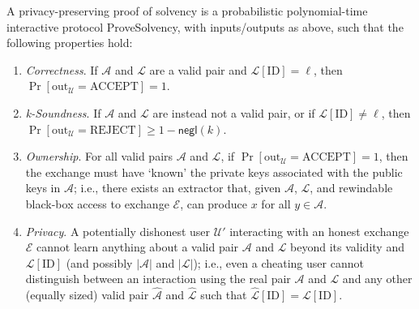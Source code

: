 \begin{definition}
\label{def:2}

A privacy-preserving proof of solvency is a probabilistic polynomial-time interactive protocol ProveSolvency, with inputs/outputs as above, such that the following properties hold:

\begin{enumerate}
\item \textit{Correctness}. If $\mathcal{A}$ and $\mathcal{L}$ are a valid pair and $\mathcal{L}[\text{ID}] = \ell$, then $\Pr[\text{out}_{\mathcal{U}} = \text{ACCEPT}] = 1$.
\item \textit{k-Soundness}. If $\mathcal{A}$ and $\mathcal{L}$ are instead not a valid pair, or if $\mathcal{L}[\text{ID}] \neq \ell$, then $\Pr[\text{out}_{\mathcal{U}} = \text{REJECT}] \geq 1 - \mathsf{negl}(k)$.
\item \textit{Ownership}. For all valid pairs $\mathcal{A}$ and $\mathcal{L}$, if $\Pr[\text{out}_{\mathcal{U}} = \text{ACCEPT}] = 1$, then the exchange must have ‘known’ the private keys associated with the public keys in $\mathcal{A}$; i.e., there exists an extractor that, given $\mathcal{A}$, $\mathcal{L}$, and rewindable black-box access to exchange $\mathcal{E}$, can produce $x$ for all $y \in \mathcal{A}$.
\item \textit{Privacy}. A potentially dishonest user $\mathcal{U}'$ interacting with an honest exchange $\mathcal{E}$ cannot learn anything about a valid pair $\mathcal{A}$ and $\mathcal{L}$ beyond its validity and $\mathcal{L}[\text{ID}]$ (and possibly $|\mathcal{A}|$ and $|\mathcal{L}|$); i.e., even a cheating user cannot distinguish between an interaction using the real pair $\mathcal{A}$ and $\mathcal{L}$ and any other (equally sized) valid pair $\hat{\mathcal{A}}$ and $\hat{\mathcal{L}}$ such that $\hat{\mathcal{L}}[\text{ID}] = \mathcal{L}[\text{ID}]$.
\end{enumerate}
\end{definition}
